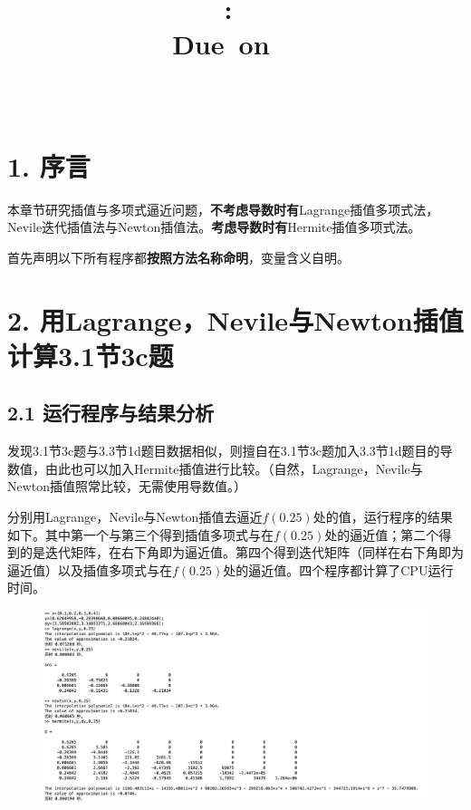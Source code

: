 \documentclass{article}
\title{
    \vspace{2in}
    \textmd{\textbf{\hmwkClass:\ \hmwkTitle}}\\
    \normalsize\vspace{0.1in}\small{Due\ on\ \hmwkDueDate\ }\\
    \vspace{0.1in}\large{\textit{\hmwkClassInstructor\ \hmwkClassTime}}
    \vspace{3in}
}
\author{\hmwkAuthorName}
\date{}
\begin{document}
\maketitle

\pagebreak
\section{1. 序言}

本章节研究插值与多项式逼近问题，\textbf{不考虑导数时有}Lagrange插值多项式法，Nevile迭代插值法与Newton插值法。\textbf{考虑导数时有}Hermite插值多项式法。

首先声明以下所有程序都\textbf{按照方法名称命明}，变量含义自明。

\section{2. 用Lagrange，Nevile与Newton插值计算3.1节3c题}

\subsection{2.1 运行程序与结果分析}
    
    发现3.1节3c题与3.3节1d题目数据相似，则擅自在3.1节3c题加入3.3节1d题目的导数值，由此也可以加入Hermite插值进行比较。（自然，Lagrange，Nevile与Newton插值照常比较，无需使用导数值。）

    分别用Lagrange，Nevile与Newton插值去逼近$f(0.25)$处的值，运行程序的结果如下。其中第一个与第三个得到插值多项式与在$f(0.25)$处的逼近值；第二个得到的是迭代矩阵，在右下角即为逼近值。第四个得到迭代矩阵（同样在右下角即为逼近值）以及插值多项式与在$f(0.25)$处的逼近值。四个程序都计算了CPU运行时间。
    \begin{figure}[h]
    \centering
    \includegraphics[scale=0.4]{Programme1}
    \end{figure}
\end{document}
